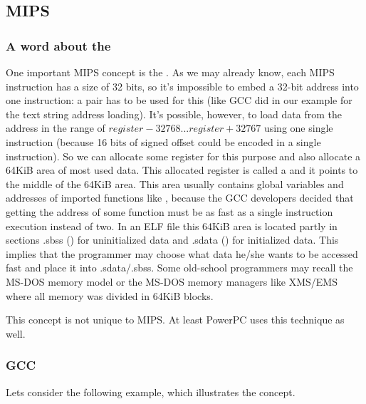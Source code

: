 \subsection{MIPS}

\subsubsection{A word about the }
\label{MIPS_GP}


One important MIPS concept is the .
As we may already know, each MIPS instruction has a size of 32 bits, so it's impossible to embed a 32-bit
address into one instruction: a pair has to be used for this 
(like GCC did in our example for the text string address loading).
It's possible, however, to load data from the address in the range of $register-32768...register+32767$ using one
single instruction (because 16 bits of signed offset could be encoded in a single instruction).
So we can allocate some register for this purpose and also allocate a 64KiB area of most used data.
This allocated register is called a  and it points to the middle of the 64KiB area.
This area usually contains global variables and addresses of imported functions like \printf, 
because the GCC developers decided that getting the address of some function must be as fast as a single instruction
execution instead of two.
In an ELF file this 64KiB area is located partly in sections .sbss () for uninitialized data and 
.sdata () for initialized data.
This implies that the programmer may choose what data he/she wants to be accessed fast and place it into 
.sdata/.sbss.
Some old-school programmers may recall the MS-DOS memory model  
or the MS-DOS memory managers like XMS/EMS where all memory was divided in 64KiB blocks.


This concept is not unique to MIPS. At least PowerPC uses this technique as well.

\subsubsection{\Optimizing GCC}

Lets consider the following example, which illustrates the  concept.



